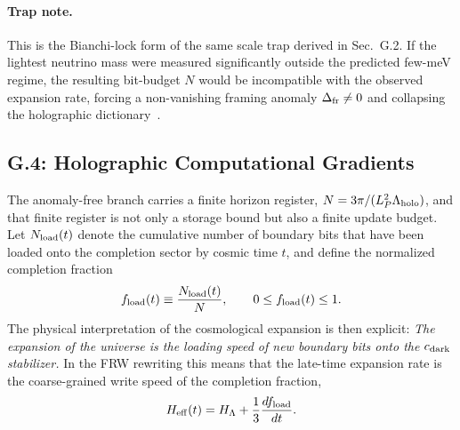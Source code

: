 \documentclass[11pt]{article}
\begin{document}
\paragraph{Trap note.}
This is the Bianchi-lock form of the same scale trap derived in
Sec.~G.2. If the lightest neutrino mass were measured significantly
outside the predicted few-meV regime, the resulting bit-budget $N$
would be incompatible with the observed expansion rate, forcing a
non-vanishing framing anomaly $\Delta_{\rm fr}\neq0$ and collapsing the
holographic dictionary~\cite{friedan1987,witten1989,gko1985}.

\subsection*{G.4: Holographic Computational Gradients}

The anomaly-free branch carries a finite horizon register,
$N=3\pi/(L_P^2\Lambda_{\rm holo})$, and that finite register is not only a
storage bound but also a finite update budget. Let $N_{\rm load}(t)$ denote the
cumulative number of boundary bits that have been loaded onto the completion
sector by cosmic time $t$, and define the normalized completion fraction
\begin{equation}
\label{eq:gravity-loading-fraction}
 f_{\rm load}(t)
 \equiv
 \frac{N_{\rm load}(t)}{N},
 \qquad
 0\leq f_{\rm load}(t)\leq 1.
\end{equation}
The physical interpretation of the cosmological expansion is then explicit:
\emph{The expansion of the universe is the loading speed of new boundary bits
onto the $c_{\rm dark}$ stabilizer.}
In the FRW rewriting this means that the late-time expansion rate is the
coarse-grained write speed of the completion fraction,
\begin{equation}
\label{eq:gravity-loading-hubble}
 H_{\rm eff}(t)
 =
 H_{\Lambda}
 +
 \frac{1}{3}\frac{d f_{\rm load}}{dt}.
\end{equation}
\end{document}
